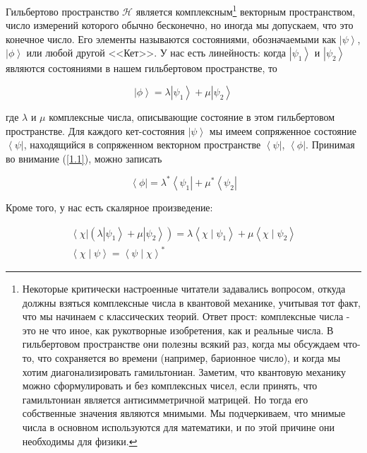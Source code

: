 \documentclass[main.tex]{subfiles}
\begin{document}
Гильбертово пространство $\mathcal{H}$ является комплексным\footnote{Некоторые критически настроенные читатели задавались вопросом, откуда должны взяться комплексные числа в квантовой механике, учитывая тот факт, что мы начинаем с классических теорий. Ответ прост: комплексные числа - это не что иное, как рукотворные изобретения, как и реальные числа. В гильбертовом пространстве они полезны всякий раз, когда мы обсуждаем что-то, что сохраняется во времени (например, барионное число), и когда мы хотим диагонализировать гамильтониан. Заметим, что квантовую механику можно сформулировать и без комплексных чисел, если принять, что гамильтониан является антисимметричной матрицей. Но тогда его собственные значения являются мнимыми. Мы подчеркиваем, что мнимые числа в основном используются для математики, и по этой причине они необходимы для физики.} векторным пространством, число измерений которого обычно бесконечно, но иногда мы допускаем, что это конечное число. Его элементы называются состояниями, обозначаемыми как $\left|\psi\right>$, $\left|\phi\right>$ или любой другой <<Кет>>. У нас есть линейность: когда $\left|\psi_1\right>$ и $\left|\psi_2\right>$ являются состояниями в нашем гильбертовом пространстве, то

\begin{equation}\label{1.1}
	\left|\phi\right> = \lambda \left|\psi_1\right> + \mu\left|\psi_2\right>
\end{equation}

где $\lambda$ и $\mu$ комплексные числа, описывающие состояние в этом гильбертовом пространстве. Для каждого кет-состояния $\left|\psi\right>$ мы имеем сопряженное состояние $\left<\psi\right|$, находящийся в сопряженном векторном пространстве $\left<\psi\right|$, $\left<\phi\right|$. Принимая во внимание (\ref{1.1}), можно записать

\begin{equation}\label{lincombconj}
	\left<\phi\right| = \lambda^* \left<\psi_1\right| + \mu^*\left<\psi_2\right|
\end{equation}

Кроме того, у нас есть скалярное произведение:

\begin{align}\label{inproduct}
	\left<\chi\right| \left( \lambda \left|\psi_1\right> + \mu\left|\psi_2\right> \right) = \lambda\left<\chi\mid\psi_1\right> + \mu\left<\chi\mid\psi_2\right> \\
	 \left<\chi\mid\psi\right> = \left<\psi\mid\chi\right>^*
\end{align}
\end{document}
